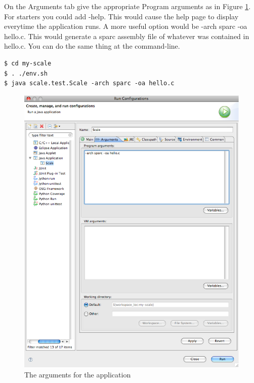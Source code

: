 \documentclass[12pt,twoside,letterpaper]{article}
\begin{document}
On the Arguments tab give the appropriate Program arguments as in Figure \ref{fig:run_java_application_arguments}. For starters you could add -help. This would cause the help page to display everytime the application runs. A more useful option would be -arch sparc -oa hello.c. This would generate a sparc assembly file of whatever was contained in hello.c. You can do the same thing at the command-line.
\begin{verbatim}
$ cd my-scale
$ . ./env.sh
$ java scale.test.Scale -arch sparc -oa hello.c
\end{verbatim}
\begin{figure}[htp]
\includegraphics[width=150mm]{run_java_application_arguments.eps}
\caption{The arguments for the application}\label{fig:run_java_application_arguments}
\end{figure}
\end{document}
